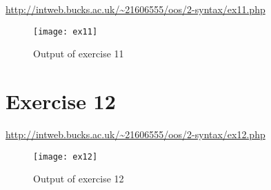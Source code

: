 \url{http://intweb.bucks.ac.uk/~21606555/oos/2-syntax/ex11.php}
\captionsetup{type=figure}


\begin{figure}[H]
  \caption{Output of exercise 11}
  \centering
  \texttt{[image: ex11]}
\end{figure}

\clearpage
\section{Exercise 12}

\url{http://intweb.bucks.ac.uk/~21606555/oos/2-syntax/ex12.php}
\captionsetup{type=figure}


\begin{figure}[H]
  \caption{Output of exercise 12}
  \centering
  \texttt{[image: ex12]}
\end{figure}
